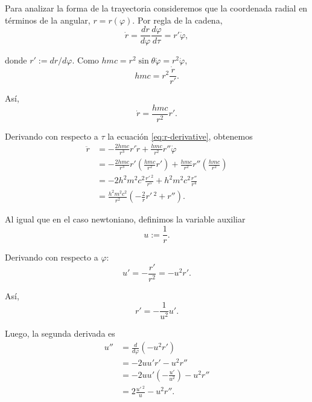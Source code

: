 \documentclass[letterpaper,11pt]{article}
\begin{document}
Para analizar la forma de la trayectoria consideremos que la coordenada radial en términos de la angular, $r = r(\varphi)$. Por regla de la cadena,
\begin{equation}
\dot{r} = \frac{dr}{d\varphi} \frac{d\varphi}{d\tau} = r' \dot{\varphi},
\end{equation}

donde $r' := dr/d\varphi$. Como $hmc = r^2 \sin\theta \dot{\varphi} = r^2 \dot{\varphi}$, 
\begin{equation}
hmc = r^2 \frac{\dot{r}}{r'}.
\end{equation}

Así,
\begin{equation} \label{eq:r-derivative}
\dot{r} = \frac{hmc}{r^2} r'.
\end{equation}

Derivando con respecto a $\tau$ la ecuación \eqref{eq:r-derivative}, obtenemos
\begin{align}
\ddot{r} &= - \frac{2 hmc}{r^3} r' \dot{r} + \frac{hmc}{r^2} r'' \dot{\varphi} \nonumber \\
&= - \frac{2 hmc}{r^3} r' \left( \frac{hmc}{r^2} r' \right) + \frac{hmc}{r^2} r'' \left( \frac{hmc}{r^2} \right) \nonumber \\
&= - 2 h^2m^2c^2 \frac{r'\,^2}{r^5} + h^2m^2c^2 \frac{r''}{r^4}\nonumber  \\
&= \frac{h^2m^2c^2}{r^2} \left( - \frac{2}{r} r'\,^2 + r'' \right). \label{eq:r-second-derivative}
\end{align}

Al igual que en el caso newtoniano, definimos la variable auxiliar
\begin{equation} \label{eq:def-u}
u := \frac{1}{r}.
\end{equation}

Derivando con respecto a $\varphi$:
\begin{equation}
u' = - \frac{r'}{r^2} = - u^2 r'.
\end{equation}

Así,
\begin{equation} \label{eq:derivative-u}
r' = - \frac{1}{u^2} u'.
\end{equation}

Luego, la segunda derivada es
\begin{align}
u'' &= \frac{d}{d\varphi} (-u^2 r') \nonumber \\
&= -2 u u' r' - u^2 r'' \nonumber \\
&=  -2 u u' \left(- \frac{u'}{u^2} \right) - u^2 r'' \nonumber \\
&= 2 \frac{u'\,^2}{u} - u^2 r''.
\end{align}
\end{document}
